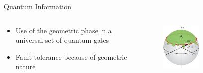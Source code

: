 \documentclass[9pt]{beamer}
\begin{document}





\begin{frame}{Quantum Information}

  \begin{columns}
    \begin{column}{0.5 \textwidth}
      
      \begin{itemize}
        \item Use of the geometric phase in a universal set of quantum gates
        \item Fault tolerance because of geometric nature
      \end{itemize}

    \end{column}

    \begin{column}{0.5\textwidth}

       \begin{figure}
         \includegraphics[width=0.5\textwidth]{geo_qbit}
       \end{figure}


\end{column}
\end{columns}
\end{frame}
\end{document}
